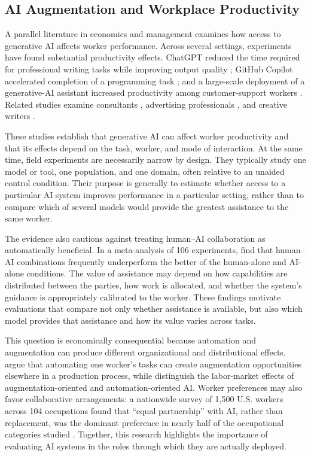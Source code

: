 \subsection{AI Augmentation and Workplace Productivity}

A parallel literature in economics and management examines how access to generative AI affects worker performance. Across several settings, experiments have found substantial productivity effects. ChatGPT reduced the time required for professional writing tasks while improving output quality \citep{noy2023}; GitHub Copilot accelerated completion of a programming task \citep{peng2023}; and a large-scale deployment of a generative-AI assistant increased productivity among customer-support workers \citep{brynjolfsson2025}. Related studies examine consultants \citep{dellacqua2023}, advertising professionals \citep{chen2024, ju2026}, and creative writers \citep{doshi2024}.

These studies establish that generative AI can affect worker productivity and that its effects depend on the task, worker, and mode of interaction. At the same time, field experiments are necessarily narrow by design. They typically study one model or tool, one population, and one domain, often relative to an unaided control condition. Their purpose is generally to estimate whether access to a particular AI system improves performance in a particular setting, rather than to compare which of several models would provide the greatest assistance to the same worker.

The evidence also cautions against treating human--AI collaboration as automatically beneficial. In a meta-analysis of 106 experiments, \citet{vaccaro2024} find that human--AI combinations frequently underperform the better of the human-alone and AI-alone conditions. The value of assistance may depend on how capabilities are distributed between the parties, how work is allocated, and whether the system's guidance is appropriately calibrated to the worker. These findings motivate evaluations that compare not only whether assistance is available, but also which model provides that assistance and how its value varies across tasks.

This question is economically consequential because automation and augmentation can produce different organizational and distributional effects. \citet{agrawal2023} argue that automating one worker's tasks can create augmentation opportunities elsewhere in a production process, while \citet{marguerit2025} distinguish the labor-market effects of augmentation-oriented and automation-oriented AI. Worker preferences may also favor collaborative arrangements: a nationwide survey of 1,500 U.S. workers across 104 occupations found that ``equal partnership'' with AI, rather than replacement, was the dominant preference in nearly half of the occupational categories studied \citep{shao2025}. Together, this research highlights the importance of evaluating AI systems in the roles through which they are actually deployed.

